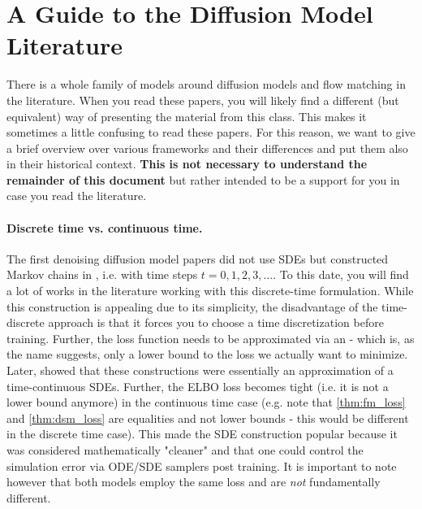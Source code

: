 \section{A Guide to the  Diffusion Model Literature}
\label{subsec:guide_to_flow_matching_literature}

There is a whole family of models around diffusion models and flow matching in the literature. When you read these papers, you will likely find a different (but equivalent) way of presenting the material from this class. This makes it sometimes a little confusing to read these papers. For this reason, we want to give a brief overview over various frameworks and their differences and put them also in their historical context. \textbf{This is not necessary to understand the remainder of this document} but rather intended to be a support for you in case you read the literature.

\paragraph{Discrete time vs. continuous time.} The first denoising diffusion model papers \citep{sohl2015deep, song2019generative, ho2020denoising} did not use SDEs but constructed Markov chains in , i.e. with time steps $t=0,1,2,3,\dots$. To this date, you will find a lot of works in the literature working with this discrete-time formulation. While this construction is appealing due to its simplicity, the disadvantage of the time-discrete approach is that it forces you to choose a time discretization before training. Further, the loss function needs to be approximated via an  - which is, as the name suggests, only a lower bound to the loss we actually want to minimize. Later, \citet{song2020score} showed that these constructions were essentially an approximation of a time-continuous SDEs. Further, the ELBO loss becomes tight (i.e. it is not a lower bound anymore) in the continuous time case (e.g. note that \cref{thm:fm_loss} and \cref{thm:dsm_loss} are equalities and not lower bounds - this would be different in the discrete time case). This made the SDE construction popular because it was considered mathematically "cleaner" and that one could control the simulation error via ODE/SDE samplers post training. It is important to note however that both models employ the same loss and are \textit{not} fundamentally different.

